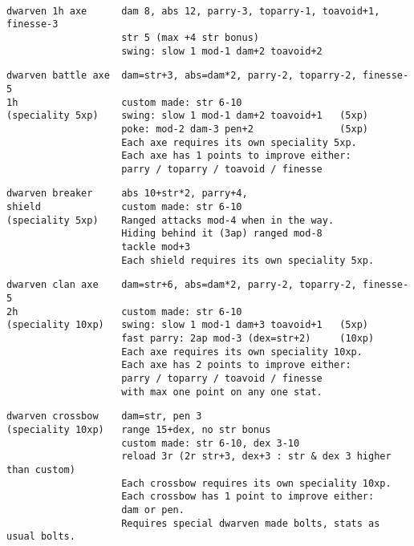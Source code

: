 \

\small \begin{samepage} \begin{verbatim}
dwarven 1h axe      dam 8, abs 12, parry-3, toparry-1, toavoid+1, finesse-3
                    str 5 (max +4 str bonus)
                    swing: slow 1 mod-1 dam+2 toavoid+2
\end{verbatim} \blocklistgap \begin{verbatim}
dwarven battle axe  dam=str+3, abs=dam*2, parry-2, toparry-2, finesse-5
1h                  custom made: str 6-10
(speciality 5xp)    swing: slow 1 mod-1 dam+2 toavoid+1   (5xp)
                    poke: mod-2 dam-3 pen+2               (5xp)
                    Each axe requires its own speciality 5xp.
                    Each axe has 1 points to improve either:
                    parry / toparry / toavoid / finesse
\end{verbatim} \blocklistgap \begin{verbatim}
dwarven breaker     abs 10+str*2, parry+4,
shield              custom made: str 6-10
(speciality 5xp)    Ranged attacks mod-4 when in the way.
                    Hiding behind it (3ap) ranged mod-8
                    tackle mod+3
                    Each shield requires its own speciality 5xp.
\end{verbatim} \blocklistgap \begin{verbatim}
dwarven clan axe    dam=str+6, abs=dam*2, parry-2, toparry-2, finesse-5
2h                  custom made: str 6-10
(speciality 10xp)   swing: slow 1 mod-1 dam+3 toavoid+1   (5xp)
                    fast parry: 2ap mod-3 (dex=str+2)     (10xp)
                    Each axe requires its own speciality 10xp.
                    Each axe has 2 points to improve either:
                    parry / toparry / toavoid / finesse
                    with max one point on any one stat.
\end{verbatim} \blocklistgap \begin{verbatim}
dwarven crossbow    dam=str, pen 3
(speciality 10xp)   range 15+dex, no str bonus
                    custom made: str 6-10, dex 3-10
                    reload 3r (2r str+3, dex+3 : str & dex 3 higher than custom)
                    Each crossbow requires its own speciality 10xp.
                    Each crossbow has 1 point to improve either:
                    dam or pen.
                    Requires special dwarven made bolts, stats as usual bolts.
\end{verbatim} \end{samepage} \normalsize


